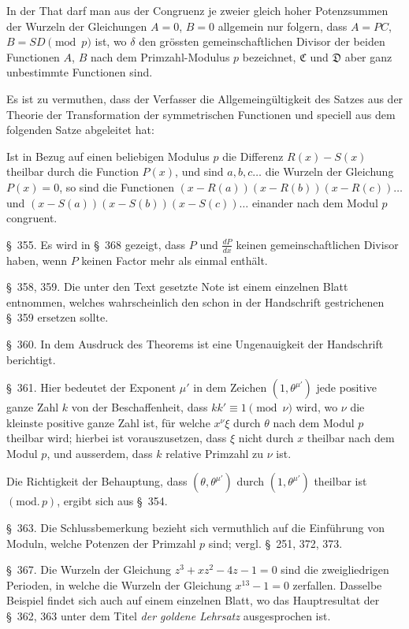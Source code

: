 \documentclass[12pt,a4paper]{article}
\begin{document}
In der That darf man aus der Congruenz je zweier gleich hoher Potenzsummen der Wurzeln der Gleichungen $A=0$, $B=0$ allgemein nur folgern, dass $A=PC$, $B=SD \pmod{p}$ ist, wo $\delta$ den gr\"ossten gemeinschaftlichen Divisor der beiden Functionen $A$, $B$ nach dem Primzahl-Modulus $p$ bezeichnet, $\mathfrak{C}$ und $\mathfrak{D}$ aber ganz unbestimmte Functionen sind.

Es ist zu vermuthen, dass der Verfasser die Allgemeing\"ultigkeit des Satzes aus der Theorie der Transformation der symmetrischen Functionen und speciell aus dem folgenden Satze abgeleitet hat:

Ist in Bezug auf einen beliebigen Modulus $p$ die Differenz $R(x)-S(x)$ theilbar durch die Function $P(x)$, und sind $a, b, c\ldots$ die Wurzeln der Gleichung $P(x)=0$, so sind die Functionen $(x-R(a))(x-R(b))(x-R(c))\ldots$ und $(x-S(a))(x-S(b))(x-S(c))\ldots$ einander nach dem Modul $p$ congruent.

\S\ 355. Es wird in \S\ 368 gezeigt, dass $P$ und $\frac{dP}{dx}$ keinen gemeinschaftlichen Divisor haben, wenn $P$ keinen Factor mehr als einmal enth\"alt.

\S\ 358, 359. Die unter den Text gesetzte Note ist einem einzelnen Blatt entnommen, welches wahrscheinlich den schon in der Handschrift gestrichenen \S\ 359 ersetzen sollte.

\S\ 360. In dem Ausdruck des Theorems ist eine Ungenauigkeit der Handschrift berichtigt.

\S\ 361. Hier bedeutet der Exponent $\mu'$ in dem Zeichen $(1,\theta^{\mu'})$ jede positive ganze Zahl $k$ von der Beschaffenheit, dass $kk'\equiv 1 \pmod{\nu}$ wird, wo $\nu$ die kleinste positive ganze Zahl ist, f\"ur welche $x^{\nu}\xi$ durch $\theta$ nach dem Modul $p$ theilbar wird; hierbei ist vorauszusetzen, dass $\xi$ nicht durch $x$ theilbar nach dem Modul $p$, und ausserdem, dass $k$ relative Primzahl zu $\nu$ ist.

Die Richtigkeit der Behauptung, dass $(\theta,\theta^{\mu'})$ durch $(1,\theta^{\mu'})$ theilbar ist $(\text{mod.}\,p)$, ergibt sich aus \S\ 354.

\S\ 363. Die Schlussbemerkung bezieht sich vermuthlich auf die Einf\"uhrung von Moduln, welche Potenzen der Primzahl $p$ sind; vergl. \S\ 251, 372, 373.

\S\ 367. Die Wurzeln der Gleichung $z^3+xz^2-4z-1=0$ sind die zweigliedrigen Perioden, in welche die Wurzeln der Gleichung $x^{13}-1=0$ zerfallen. Dasselbe Beispiel findet sich auch auf einem einzelnen Blatt, wo das Hauptresultat der \S\ 362, 363 unter dem Titel \textit{der goldene Lehrsatz} ausgesprochen ist.
\end{document}
